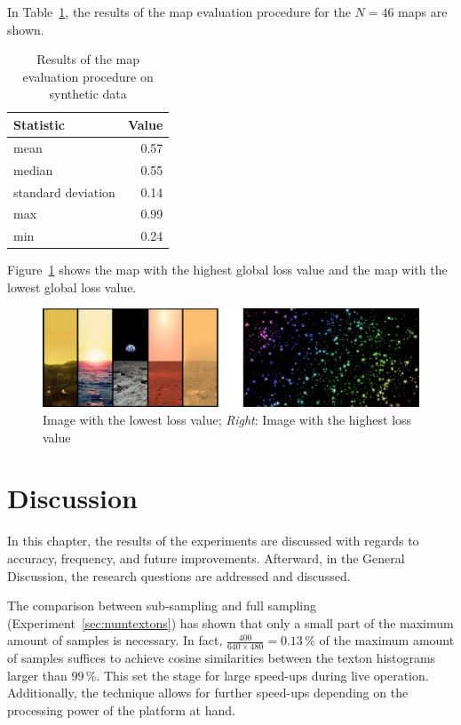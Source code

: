 \documentclass[11pt]{report}
\begin{document}
In Table~\ref{tab:mapeval}, the results of the map evaluation
procedure for the $N = 46$ maps are shown.

\begin{table}[h]
  \centering
  \begin{tabular}{lr}
    \toprule
    Statistic & Value\\
    \midrule
    mean & 0.57\\
    median & 0.55\\
    standard deviation & 0.14\\
    max & 0.99\\
    min & 0.24\\    
    \bottomrule
  \end{tabular}
  \caption[Map evaluation procedure on synthetic data]{Results of the map evaluation procedure on synthetic data}
  \label{tab:mapeval}

\end{table}

Figure~\ref{fig:minmaximg} shows the map with the highest global loss
value and the map with the lowest global loss value.

\begin{figure}[h!]
\begin{center}
\includegraphics[width=0.7\columnwidth]{lowest_highest}
\caption{{\label{fig:minmaximg}
Image with the lowest loss value; \emph{Right}:
    Image with the highest loss value%
}}
\end{center}
\end{figure}

\chapter{Discussion}
\label{chap:discussion}

In this chapter, the results of the experiments are discussed with
regards to accuracy, frequency, and future improvements. Afterward, in
the General Discussion, the research questions are addressed and
discussed.

The comparison between sub-sampling and full sampling
(Experiment~\ref{sec:numtextons}) has shown that only a small part of
the maximum amount of samples is necessary. In fact,
$\frac{400}{640 \times 480} = 0.13\,\%$ of the maximum amount of
samples suffices to achieve cosine similarities between the texton
histograms larger than $99\,\%$. This set the stage for large
speed-ups during live operation. Additionally, the technique allows
for further speed-ups depending on the processing power of the
platform at hand.
\end{document}
